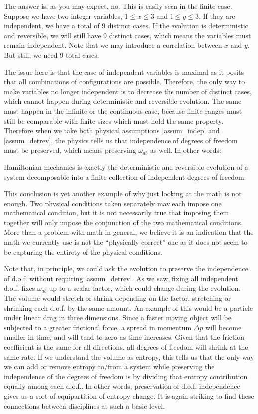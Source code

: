 The answer is, as you may expect, no. This is easily seen in the finite case. Suppose we have two integer variables, $1 \leq x \leq 3$ and $1 \leq y \leq 3$. If they are independent, we have a total of $9$ distinct cases. If the evolution is deterministic and reversible, we will still have $9$ distinct cases, which means the variables must remain independent. Note that we may introduce a correlation between $x$ and $y$. But still, we need $9$ total cases.

The issue here is that the case of independent variables is maximal as it posits that all combinations of configurations are possible. Therefore, the only way to make variables no longer independent is to decrease the number of distinct cases, which cannot happen during deterministic and reversible evolution. The same must happen in the infinite or the continuous case, because finite ranges must still be comparable with finite sizes which must hold the same property. Therefore when we take both physical assumptions \ref{assum_indep} and \ref{assum_detrev}, the physics tells us that independence of degrees of freedom must be preserved, which means preserving $\omega_{ab}$ as well. In other words:
\begin{insight}
	Hamiltonian mechanics is exactly the deterministic and reversible evolution of a system decomposable into a finite collection of independent degrees of freedom.
\end{insight} 

This conclusion is yet another example of why just looking at the math is not enough. Two physical conditions taken separately may each impose one mathematical condition, but it is not necessarily true that imposing them together will only impose the conjunction of the two mathematical conditions. More than a problem with math in general, we believe it is an indication that the math we currently use is not the ``physically correct'' one as it does not seem to be capturing the entirety of the physical conditions. 

Note that, in principle, we could ask the evolution to preserve the independence of d.o.f. without requiring \ref{assum_detrev}. As we saw, fixing all independent d.o.f. fixes $\omega_{ab}$ up to a scalar factor, which could change during the evolution. The volume would stretch or shrink depending on the factor, stretching or shrinking each d.o.f. by the same amount. An example of this would be a particle under linear drag in three dimensions. Since a faster moving object will be subjected to a greater frictional force, a spread in momentum $\Delta p$ will become smaller in time, and will tend to zero as time increases. Given that the friction coefficient is the same for all directions, all degrees of freedom will shrink at the same rate. If we understand the volume as entropy, this tells us that the only way we can add or remove entropy to/from a system while preserving the independence of the degrees of freedom is by dividing that entropy contribution equally among each d.o.f.. In other words, preservation of d.o.f. independence gives us a sort of equipartition of entropy change. It is again striking to find these connections between disciplines at such a basic level.

